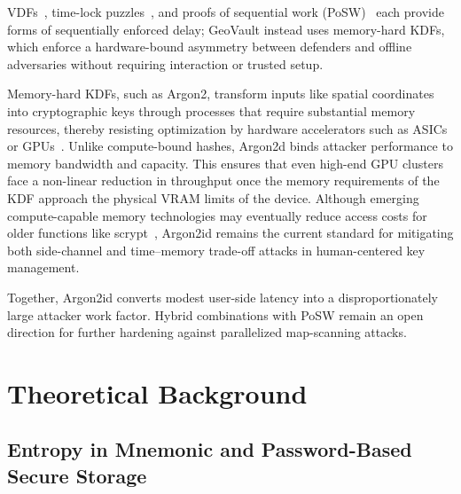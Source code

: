 \documentclass[mathematics,article,accept,pdftex,moreauthors]{Definitions/mdpi}
\begin{document}

{VDFs~\cite{Boneh2018, Wesolowski2019}, time-lock puzzles~\cite{Mahmoody2011}, and proofs of sequential work (PoSW)~\cite{Cohen2018} each provide forms of sequentially enforced delay; GeoVault instead uses memory-hard KDFs, which enforce a hardware-bound asymmetry between defenders and offline adversaries without requiring interaction or trusted setup.}

{Memory-hard KDFs, such as Argon2, transform inputs like spatial coordinates into cryptographic keys through processes that require substantial memory resources, thereby resisting optimization by hardware accelerators such as ASICs or GPUs~\cite{7467361, Wetzels2016}. Unlike compute-bound hashes, Argon2d binds attacker performance to memory bandwidth and capacity. This ensures that even high-end GPU clusters face a non-linear reduction in throughput once the memory requirements of the KDF approach the physical VRAM limits of the device. Although emerging compute-capable memory technologies may eventually reduce access costs for older functions like scrypt~\cite{Choe2019}, Argon2id remains the current standard for mitigating both side-channel and time--memory trade-off attacks in human-centered key management.}

{Together, Argon2id converts modest user-side latency into a disproportionately large attacker work factor. Hybrid combinations with PoSW remain an open direction for further hardening against parallelized map-scanning attacks.}

\section{Theoretical Background\label{sec3}}

\subsection{Entropy in Mnemonic and Password-Based Secure Storage}
\end{document}
